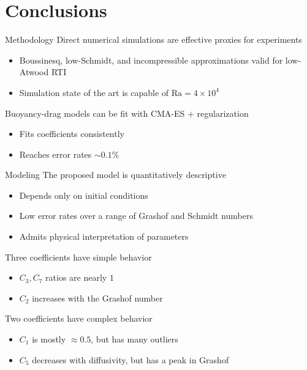 \documentclass[12pt]{beamer}
\begin{document}
\section{Conclusions}
\begin{frame}{Methodology}
Direct numerical simulations are effective proxies for experiments
\begin{itemize}
  \item Boussinesq, low-Schmidt, and incompressible approximations valid for low-Atwood RTI
  \item Simulation state of the art is capable of $\text{Ra} = 4 \times 10^{4}$
\end{itemize}
\vspace{20pt}

Buoyancy-drag models can be fit with CMA-ES $+$ regularization
\begin{itemize}
  \item Fits coefficients consistently
  \item Reaches error rates $\sim 0.1 \%$
\end{itemize}
\end{frame}

\begin{frame}{Modeling}
The proposed model is quantitatively descriptive
\begin{itemize}
  \item Depends only on initial conditions
  \item Low error rates over a range of Grashof and Schmidt numbers
  \item Admits physical interpretation of parameters
\end{itemize}

Three coefficients have simple behavior
\begin{itemize}
  \item $C_3, C_7$ ratios are nearly $1$
  \item $C_2$ increases with the Grashof number
\end{itemize}

Two coefficients have complex behavior
\begin{itemize}
  \item $C_1$ is mostly $\approx 0.5$, but has many outliers
  \item $C_5$ decreases with diffusivity, but has a peak in Grashof
\end{itemize}
\end{frame}
\end{document}
